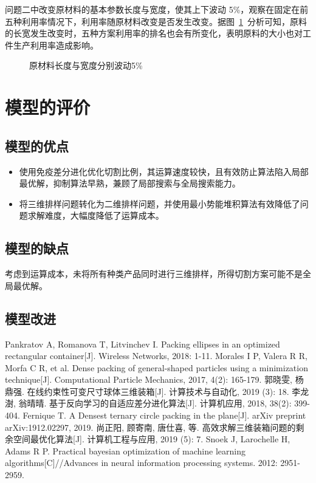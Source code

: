 \documentclass{whutmod}
\begin{document}
   	问题二中改变原材料的基本参数长度与宽度，使其上下波动 5\%，观察在固定在前五种利用率情况下，利用率随原材料改变是否发生改变。据图~\ref{adasfasad}~分析可知，原料的长宽发生改变时，五种方案利用率的排名也会有所变化，表明原料的大小也对工件生产利用率造成影响。
    \begin{figure}[H]
 	\centering
 	\caption{原材料长度与宽度分别波动5\%}\label{adasfasad}
 \end{figure}
 
 
  	\section{模型的评价}
		\subsection{模型的优点}
			\begin{itemize}                                             
			\item [(1)]使用免疫差分进化优化切割比例，其运算速度较快，且有效防止算法陷入局部最优解，抑制算法早熟，兼顾了局部搜索与全局搜索能力。
			\item [(2)] 将三维排样问题转化为二维排样问题，并使用最小势能堆积算法有效降低了问题求解难度，大幅度降低了运算成本。
			\end{itemize}
		\subsection{模型的缺点}
		考虑到运算成本，未将所有种类产品同时进行三维排样，所得切割方案可能不是全局最优解。
  		\subsection{模型改进}

  
  
 
	\newpage	%
	\nocite{*}		%
	\begin{thebibliography}{9}%
		Pankratov A, Romanova T, Litvinchev I. Packing ellipses in an optimized rectangular container[J]. Wireless Networks, 2018: 1-11.
		Morales I P, Valera R R, Morfa C R, et al. Dense packing of general-shaped particles using a minimization technique[J]. Computational Particle Mechanics, 2017, 4(2): 165-179.
		郭晓雯, 杨鼎强. 在线约束性可变尺寸球体三维装箱[J]. 计算技术与自动化, 2019 (3): 18.
		李龙澍, 翁晴晴. 基于反向学习的自适应差分进化算法[J]. 计算机应用, 2018, 38(2): 399-404.
		Fernique T. A Densest ternary circle packing in the plane[J]. arXiv preprint arXiv:1912.02297, 2019.
		尚正阳, 顾寄南, 唐仕喜, 等. 高效求解三维装箱问题的剩余空间最优化算法[J]. 计算机工程与应用, 2019 (5): 7.
		Snoek J, Larochelle H, Adams R P. Practical bayesian optimization of machine learning algorithms[C]//Advances in neural information processing systems. 2012: 2951-2959.
	\end{thebibliography}
\end{document}
